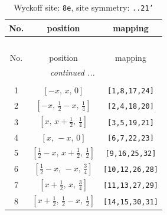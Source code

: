 \documentclass[fleqn,8pt]{jsarticle}
\begin{document}
\begin{longtable}{ccc}
\caption{Wyckoff site: {\tt 8e}, site symmetry: {\tt ..21'}}
 \\
 \hline \hline
No. & position & mapping \\ \hline \endfirsthead

\multicolumn{2}{l}{\tablename\ \thetable{}} \\
 \hline \hline
No. & position & mapping \\ \hline \endhead

 \hline \hline
\multicolumn{2}{r}{\footnotesize\it continued ...} \\ \endfoot

 \hline \hline
\multicolumn{2}{r}{} \\ \endlastfoot

1 & $\left[ - x,\, x,\, 0 \right]$ & {\tt [1,8,17,24]} \\ \hline
2 & $\left[ - x,\, \frac{1}{2} - x,\, \frac{1}{4} \right]$ & {\tt [2,4,18,20]} \\ \hline
3 & $\left[ x,\, x + \frac{1}{2},\, \frac{1}{4} \right]$ & {\tt [3,5,19,21]} \\ \hline
4 & $\left[ x,\, - x,\, 0 \right]$ & {\tt [6,7,22,23]} \\ \hline
5 & $\left[ \frac{1}{2} - x,\, x + \frac{1}{2},\, \frac{1}{2} \right]$ & {\tt [9,16,25,32]} \\ \hline
6 & $\left[ \frac{1}{2} - x,\, - x,\, \frac{3}{4} \right]$ & {\tt [10,12,26,28]} \\ \hline
7 & $\left[ x + \frac{1}{2},\, x,\, \frac{3}{4} \right]$ & {\tt [11,13,27,29]} \\ \hline
8 & $\left[ x + \frac{1}{2},\, \frac{1}{2} - x,\, \frac{1}{2} \right]$ & {\tt [14,15,30,31]} \\
\end{longtable}
\renewcommand{\arraystretch}{1.2}
\end{document}
